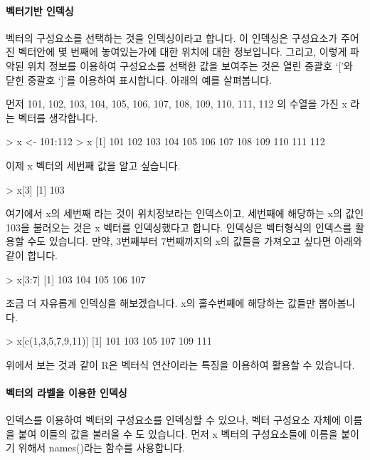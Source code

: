 \documentclass[tutorial.tex]{subfiles}
\begin{document}
\paragraph{벡터기반 인덱싱} 벡터의 구성요소를 선택하는 것을 인덱싱이라고 합니다. 
이 인덱싱은 구성요소가 주어진 벡터안에 몇 번째에 놓여있는가에 대한 위치에 대한 정보입니다.
그리고, 이렇게 파악된 위치 정보를 이용하여 구성요소를 선택한 값을 보여주는 것은 열린 중괄호 `['와 닫힌 중괄호 `]'를 이용하여 표시합니다. 
아래의 예를 살펴봅니다. 

먼저 101, 102, 103, 104, 105, 106, 107, 108, 109, 110, 111, 112 의 수열을 가진 x 라는 벡터를 생각합니다. 
 
\begin{Schunk}
\begin{Soutput}
> x <- 101:112
> x
 [1] 101 102 103 104 105 106 107 108 109 110 111 112
\end{Soutput}
\end{Schunk}

이제 x 벡터의 세번째 값을 알고 싶습니다. 

\begin{Schunk}
\begin{Soutput}
> x[3]
[1] 103
\end{Soutput}
\end{Schunk}

여기에서 x의 세번째 라는 것이 위치정보라는 인덱스이고, 세번째에 해당하는 x의 값인 103을 불러오는 것은 x 벡터를 인덱싱했다고 합니다. 
인덱싱은 벡터형식의 인덱스를 활용할 수도 있습니다.
만약, 3번째부터 7번째까지의 x의 값들을 가져오고 싶다면 아래와 같이 합니다. 

\begin{Schunk}
\begin{Soutput}
> x[3:7]
[1] 103 104 105 106 107
\end{Soutput}
\end{Schunk}

조금 더 자유롭게 인덱싱을 해보겠습니다. 
x의 홀수번째에 해당하는 값들만 뽑아봅니다. 

\begin{Schunk}
\begin{Soutput}
> x[c(1,3,5,7,9,11)]
[1] 101 103 105 107 109 111
\end{Soutput}
\end{Schunk}

위에서 보는 것과 같이 R은 벡터식 연산이라는 특징을 이용하여 활용할 수 있습니다.

\paragraph{벡터의 라벨을 이용한 인덱싱} 
인덱스를 이용하여 벡터의 구성요소를 인덱싱할 수 있으나, 벡터 구성요소 자체에 이름을 붙여 이들의 값을 불러올 수 도 있습니다. 
먼저 x 벡터의 구성요소들에 이름을 붙이기 위해서 names()라는 함수를 사용합니다. 
\end{document}
